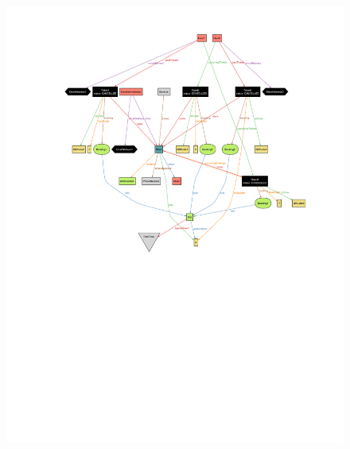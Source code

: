 \documentclass[table, 12pt]{article}
\begin{document}
\begin{flushleft}
\begin{landscape}
\begin{figure}[H]
            \includegraphics[scale=1.3]{assets/world2.pdf}
        \end{figure}
        \thispagestyle{empty}
        \begin{figure}[H]
            \vspace*{-100px}
            \hspace*{-150px}

\end{figure}
\end{landscape}
\end{flushleft}
\end{document}
